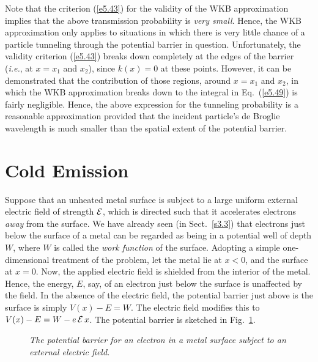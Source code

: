 Note that the criterion (\ref{e5.43}) for the validity of the WKB approximation
implies that the above transmission probability is {\em very small}. Hence,
the WKB approximation only applies to situations in which there is
very little chance of a particle tunneling through the potential barrier in question.
Unfortunately, the validity criterion (\ref{e5.43}) breaks down completely
at the edges of the barrier ({\em i.e.}, at $x=x_1$ and $x_2$), since
$k(x)=0$ at these points. However, it can be demonstrated that the
contribution of those regions, around $x=x_1$ and $x_2$, in which the WKB
approximation breaks down to the integral in Eq.~(\ref{e5.49})
is fairly negligible. Hence, the above expression for the tunneling
probability is a reasonable approximation provided that the incident particle's
de Broglie wavelength is  much smaller than the spatial extent of the potential
barrier.

\section{Cold Emission}
Suppose that an unheated  metal surface is subject to a large uniform external electric field
of strength ${\cal E}$,
which is directed such that it accelerates electrons {\em away}\/ from the surface. We have
already seen (in Sect.~\ref{s3.3}) that electrons just below the surface
of a metal can be regarded as being in a potential well of depth $W$,
where $W$ is called the {\em work function}\/ of the surface. Adopting a simple
one-dimensional treatment of the problem, let the metal lie at $x<0$, and
the surface at $x=0$. Now, the applied electric field is shielded from the
interior of the metal.  Hence, the energy, $E$, say, of an electron just below the
surface is unaffected by the field.
In the absence of the electric field, the potential
barrier just above is the surface is simply $V(x)-E=W$. The electric field
modifies this to $V(x)-E=W-e\,{\cal E}\,x$. The potential barrier is
sketched in Fig.~\ref{fcold}.

\begin{figure}
\epsfysize=3in
\centerline{}
\caption{\em The potential barrier for an electron  in a metal
surface subject to an external electric field.}\label{fcold}   
\end{figure}

